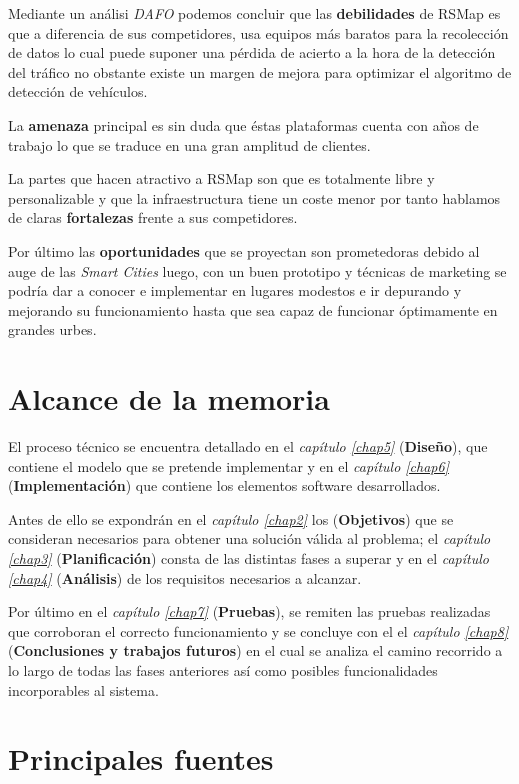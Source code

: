 \newpage

Mediante un análisi \textit{DAFO} podemos concluir que las \textbf{debilidades} de RSMap es que a diferencia de sus competidores, usa equipos más baratos para la recolección de datos lo cual puede suponer una pérdida de acierto a la hora de la detección del tráfico no obstante existe un margen de mejora para optimizar el algoritmo de detección de vehículos.

La \textbf{amenaza} principal es sin duda que éstas plataformas cuenta con años de trabajo lo que se traduce en una gran amplitud de clientes.

La partes que hacen atractivo a RSMap son que es totalmente libre y personalizable y que la infraestructura tiene un coste menor por tanto hablamos de claras \textbf{fortalezas} frente a sus competidores.

Por último las \textbf{oportunidades} que se proyectan son prometedoras debido al auge de las \textit{Smart Cities} luego, con un buen prototipo y técnicas de marketing se podría dar a conocer e implementar en lugares modestos e ir depurando y mejorando su funcionamiento hasta que sea capaz de funcionar óptimamente en grandes urbes.


\section{Alcance de la memoria}

El proceso técnico se encuentra detallado en el \textit{capítulo \ref{chap5}} (\textbf{Diseño}), que contiene el modelo que se pretende implementar y en el \textit{capítulo \ref{chap6}} (\textbf{Implementación}) que contiene los elementos software desarrollados.

Antes de ello se expondrán en el \textit{capítulo \ref{chap2}}  los (\textbf{Objetivos}) que se consideran necesarios para obtener una solución válida al problema; el \textit{capítulo \ref{chap3}} (\textbf{Planificación}) consta de las distintas fases a superar y en el \textit{capítulo \ref{chap4}} (\textbf{Análisis}) de los requisitos necesarios a alcanzar.

\bigskip
Por último en el \textit{capítulo \ref{chap7}} (\textbf{Pruebas}), se remiten las pruebas realizadas que corroboran el correcto funcionamiento y se concluye con el el \textit{capítulo \ref{chap8}}  (\textbf{Conclusiones y trabajos futuros}) en el cual se analiza el camino recorrido a lo largo de todas las fases anteriores así como posibles funcionalidades incorporables al sistema.

\section{Principales fuentes}
